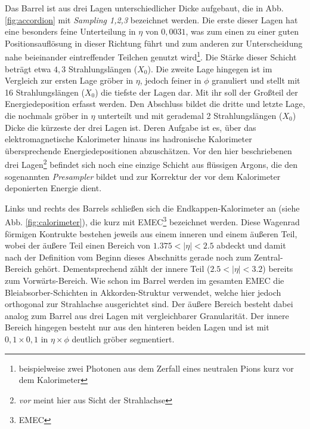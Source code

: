 Das Barrel ist aus drei Lagen unterschiedlicher Dicke aufgebaut, die in Abb.
\ref{fig:accordion} mit \textit{Sampling 1,2,3} bezeichnet werden. Die erste
dieser Lagen hat eine besonders feine Unterteilung in $\eta$ von $0,0031$, was
zum einen zu einer guten Positionsauflösung in dieser Richtung führt und zum
anderen zur Unterscheidung nahe beieinander eintreffender Teilchen genutzt
wird\footnote{beispielweise zwei Photonen aus dem Zerfall eines neutralen Pions
kurz vor dem Kalorimeter}. Die Stärke dieser Schicht beträgt etwa $4,3$
Strahlungslängen ($X_0$). Die zweite Lage hingegen ist im Vergleich zur ersten
Lage gröber in $\eta$, jedoch feiner in $\phi$ granuliert und stellt mit 16
Strahlungslängen ($X_0$) die tiefste der Lagen dar. Mit ihr soll der Großteil
der Energiedeposition erfasst werden. Den Abschluss bildet die dritte und
letzte Lage, die nochmals gröber in $\eta$ unterteilt und mit gerademal 2
Strahlungslängen ($X_0$) Dicke die kürzeste der drei Lagen ist. Deren Aufgabe
ist es, über das elektromagnetische Kalorimeter hinaus ins hadronische
Kalorimeter übersprechende Energiedepositionen abzuschätzen. Vor den hier
beschriebenen drei Lagen\footnote{\textit{vor} meint hier aus Sicht der
Strahlachse} befindet sich noch eine einzige Schicht aus flüssigen Argons, die
den sogenannten \textit{Presampler} bildet und zur Korrektur der vor dem
Kalorimeter deponierten Energie dient.

Links und rechts des Barrels schließen sich die Endkappen-Kalorimeter an (siehe
Abb. \ref{fig:calorimeter}), die kurz mit EMEC\footnote{\acf{EMEC}} bezeichnet
werden. Diese Wagenrad förmigen Kontrukte bestehen jeweils aus einem inneren
und einem äußeren Teil, wobei der äußere Teil einen Bereich von
$1.375<|\eta|<2.5$ abdeckt und damit nach der Definition vom Beginn dieses
Abschnitts gerade noch zum Zentral-Bereich gehört. Dementsprechend zählt der
innere Teil ($2.5<|\eta|<3.2$) bereits zum Vorwärts-Bereich. Wie schon im
Barrel werden im gesamten \ac{EMEC} die Bleiabsorber-Schichten in
Akkorden-Struktur verwendet, welche hier jedoch orthogonal zur Strahlachse
ausgerichtet sind. Der äußere Bereich besteht dabei analog zum Barrel aus drei
Lagen mit vergleichbarer Granularität. Der innere Bereich hingegen besteht nur
aus den hinteren beiden Lagen  und ist mit $0,1\times0,1$ in $\eta\times\phi$
deutlich gröber segmentiert.

